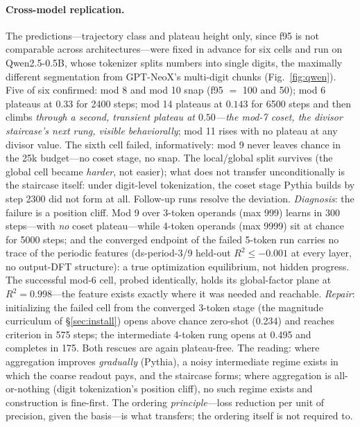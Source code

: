 \documentclass{article} %
\begin{document}
\paragraph{Cross-model replication.} The predictions---trajectory class and plateau height only, since f95 is not comparable across architectures---were fixed in advance for six cells and run on Qwen2.5-0.5B, whose tokenizer splits numbers into single digits, the maximally different segmentation from GPT-NeoX's multi-digit chunks (Fig.~\ref{fig:qwen}). Five of six confirmed: mod 8 and mod 10 snap (f95 $=$ 100 and 50); mod 6 plateaus at $0.33$ for 2400 steps; mod 14 plateaus at $0.143$ for 6500 steps and then climbs \emph{through a second, transient plateau at $0.50$---the mod-7 coset, the divisor staircase's next rung, visible behaviorally}; mod 11 rises with no plateau at any divisor value. The sixth cell failed, informatively: mod 9 never leaves chance in the 25k budget---no coset stage, no snap. The local/global split survives (the global cell became \emph{harder}, not easier); what does not transfer unconditionally is the staircase itself: under digit-level tokenization, the coset stage Pythia builds by step 2300 did not form at all. Follow-up runs resolve the deviation. \emph{Diagnosis}: the failure is a position cliff. Mod 9 over 3-token operands (max 999) learns in 300 steps---with \emph{no} coset plateau---while 4-token operands (max 9999) sit at chance for 5000 steps; and the converged endpoint of the failed 5-token run carries no trace of the periodic features (ds-period-3/9 held-out $R^2 \le -0.001$ at every layer, no output-DFT structure): a true optimization equilibrium, not hidden progress. The successful mod-6 cell, probed identically, holds its global-factor plane at $R^2 = 0.998$---the feature exists exactly where it was needed and reachable. \emph{Repair}: initializing the failed cell from the converged 3-token stage (the magnitude curriculum of \S\ref{sec:install}) opens above chance zero-shot (0.234) and reaches criterion in 575 steps; the intermediate 4-token rung opens at 0.495 and completes in 175. Both rescues are again plateau-free. The reading: where aggregation improves \emph{gradually} (Pythia), a noisy intermediate regime exists in which the coarse readout pays, and the staircase forms; where aggregation is all-or-nothing (digit tokenization's position cliff), no such regime exists and construction is fine-first. The ordering \emph{principle}---loss reduction per unit of precision, given the basis---is what transfers; the ordering itself is not required to.
\end{document}

